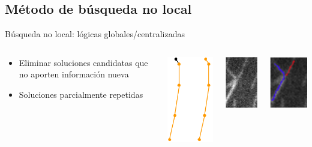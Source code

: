 \subsection{M\'etodo de b\'usqueda no local}
\begin{frame}{B\'usqueda no local: l\'ogicas globales/centralizadas}
    
    \begin{columns}
        \begin{column}{0.4\textwidth}
            \begin{itemize}
                \item Eliminar soluciones candidatas que no aporten informaci\'on nueva
                \item Soluciones parcialmente repetidas
            \end{itemize}
        \end{column}
        \begin{column}{0.2\textwidth}
        \includegraphics[scale=0.5]{Pictures/ant-segments-repetead-sol1.png}
        \end{column}
        \begin{column}{0.2\textwidth}
        \includegraphics[scale=0.5]{Pictures/NoConsenso2.png}
        \end{column}
        \begin{column}{0.2\textwidth}
        \includegraphics[scale=0.5]{Pictures/NoConsenso3.png}

\end{column}
\end{columns}
\end{frame}
